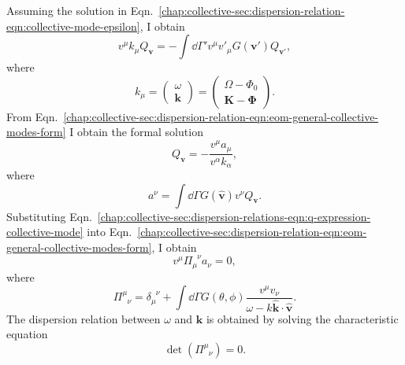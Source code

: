 Assuming the solution in Eqn.~\ref{chap:collective-sec:dispersion-relation-eqn:collective-mode-epsilon}, I obtain
\begin{equation}
    v^\mu k_\mu Q_{\mathbf v}   =  - \int \dd \Gamma' v^\mu v'_\mu G(\mathbf v')  Q_{\mathbf v'},
    \label{chap:collective-sec:dispersion-relation-eqn:eom-general-collective-modes-form}
\end{equation}
where
\begin{equation}
    k_\mu = \begin{pmatrix}
        \omega \\
        \mathbf k
    \end{pmatrix} = \begin{pmatrix}
        \Omega - \Phi_0 \\
        \mathbf K - \boldsymbol{\Phi}
    \end{pmatrix}.
\end{equation}
From Eqn.~\ref{chap:collective-sec:dispersion-relation-eqn:eom-general-collective-modes-form} I obtain the formal solution
\begin{equation}
    Q_{\mathbf v} = - \frac{ v^\mu a_\mu }{ v^\alpha k_\alpha},
    \label{chap:collective-sec:dispersion-relations-eqn:q-expression-collective-mode}
\end{equation}
where
\begin{equation}
    a^\nu = \int \dd \Gamma G(\hat{\mathbf v}) v^\nu Q_{\mathbf v}.
\end{equation}
Substituting Eqn.~\ref{chap:collective-sec:dispersion-relations-eqn:q-expression-collective-mode} into Eqn.~\ref{chap:collective-sec:dispersion-relation-eqn:eom-general-collective-modes-form}, I obtain
\begin{equation}
 v^\mu \Pi_{\mu}^{\phantom{\mu}\nu} a_\nu  = 0,
\end{equation}
where
\begin{equation}
\Pi^\mu_{\phantom{\mu}\nu} = \delta_\mu^{\phantom{\mu}\nu} + \int \dd \Gamma G(\theta,\phi) \frac{v^\mu v_\nu}{\omega- k \hat{\mathbf k}\cdot \hat{\mathbf v} }.
\end{equation}
The dispersion relation between $\omega$ and $\mathbf k$ is obtained by solving the characteristic equation~\cite{Izaguirre2016a}
\begin{equation}
\operatorname{det}\left( \Pi^\mu_{\phantom{\mu}\nu} \right) = 0.
\label{eqn-dr-determinant-equation}
\end{equation}










